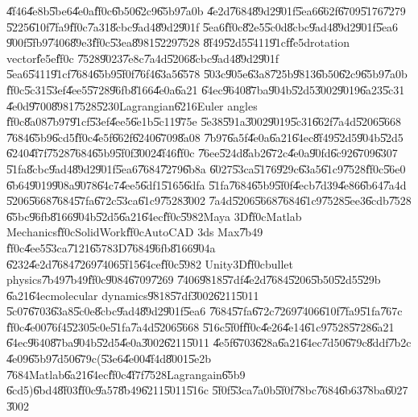 \documentclass[12pt,a4paper]{article}
\begin{document}
\U{4f46}\U{4e8b}\U{5be6}\U{4e0a}\U{ff0c}\U{6b50}\U{62c9}\U{65b9}\U{7a0b}%
\U{4e2d}\U{7684}\U{89d2}\U{901f}\U{5ea6}\U{662f}\U{6709}\U{5176}\U{7279}%
\U{5225}\U{610f}\U{7fa9}\U{ff0c}\U{7a31}\U{8cbc}\U{9ad4}\U{89d2}\U{901f}%
\U{5ea6}\U{ff0c}\U{82e5}\U{5c0d}\U{8cbc}\U{9ad4}\U{89d2}\U{901f}\U{5ea6}%
\U{900f}\U{5fb9}\U{7406}\U{89e3}\U{ff0c}\U{53ea}\U{8981}\U{5229}\U{7528}%
\U{8f49}\U{52d5}\U{5411}\U{91cf}\U{fe5d}rotation vector\U{fe5e}\U{ff0c}%
\U{7528}\U{9023}\U{7e8c}\U{7a4d}\U{5206}\U{8cbc}\U{9ad4}\U{89d2}\U{901f}%
\U{5ea6}\U{5411}\U{91cf}\U{7684}\U{65b9}\U{5f0f}\U{76f4}\U{63a5}\U{6578}%
\U{503c}\U{905e}\U{63a8}\U{725b}\U{9813}\U{6b50}\U{62c9}\U{65b9}\U{7a0b}%
\U{ff0c}\U{5c31}\U{53ef}\U{4ee5}\U{5728}\U{96fb}\U{8166}\U{4e0a}\U{6a21}%
\U{64ec}\U{9640}\U{87ba}\U{904b}\U{52d5}\U{3002}\U{9019}\U{6a23}\U{5c31}%
\U{4e0d}\U{9700}\U{8981}\U{7528}\U{5230}Lagrangian\U{6216}Euler angles%
\U{ff0c}\U{8a08}\U{7b97}\U{91cf}\U{53ef}\U{4ee5}\U{6e1b}\U{5c11}\U{975e}%
\U{5e38}\U{591a}\U{3002}\U{9019}\U{5c31}\U{662f}\U{7a4d}\U{5206}\U{5668}%
\U{7684}\U{65b9}\U{6cd5}\U{ff0c}\U{4e5f}\U{662f}\U{6240}\U{6709}\U{8a08}%
\U{7b97}\U{6a5f}\U{4e0a}\U{6a21}\U{64ec}\U{8f49}\U{52d5}\U{904b}\U{52d5}%
\U{6240}\U{4f7f}\U{7528}\U{7684}\U{65b9}\U{5f0f}\U{3002}\U{4f46}\U{ff0c}%
\U{76ee}\U{524d}\U{8ab2}\U{672c}\U{4e0a}\U{90fd}\U{6c92}\U{6709}\U{6307}%
\U{51fa}\U{8cbc}\U{9ad4}\U{89d2}\U{901f}\U{5ea6}\U{7684}\U{7279}\U{6b8a}%
\U{6027}\U{53ca}\U{5176}\U{929c}\U{63a5}\U{61c9}\U{7528}\U{ff0c}\U{56e0}%
\U{6b64}\U{9019}\U{908a}\U{9078}\U{64c7}\U{4ee5}\U{6df1}\U{5165}\U{6dfa}%
\U{51fa}\U{7684}\U{65b9}\U{5f0f}\U{4ecb}\U{7d39}\U{4e86}\U{6b64}\U{7a4d}%
\U{5206}\U{5668}\U{7684}\U{57fa}\U{672c}\U{53ca}\U{61c9}\U{7528}\U{3002}%
\U{7a4d}\U{5206}\U{5668}\U{7684}\U{61c9}\U{7528}\U{5ee3}\U{6cdb}\U{7528}%
\U{65bc}\U{96fb}\U{8166}\U{904b}\U{52d5}\U{6a21}\U{64ec}\U{ff0c}\U{5982}Maya
3D\U{ff0c}Matlab Mechanics\U{ff0c}SolidWork\U{ff0c}AutoCAD 3ds Max\U{7b49}%
\U{ff0c}\U{4ee5}\U{53ca}\U{7121}\U{6578}3D\U{7684}\U{96fb}\U{8166}\U{904a}%
\U{6232}\U{4e2d}\U{7684}\U{7269}\U{7406}\U{5f15}\U{64ce}\U{ff0c}\U{5982}%
Unity3D\U{ff0c}bullet physics\U{7b49}\U{7b49}\U{ff0c}\U{9084}\U{6709}\U{7269}%
\U{7406}\U{9818}\U{57df}\U{4e2d}\U{7684}\U{5206}\U{5b50}\U{52d5}\U{529b}%
\U{6a21}\U{64ec}molecular dynamics\U{9818}\U{57df}\U{3002}\U{6211}\U{5011}%
\U{5c07}\U{6703}\U{63a8}\U{5c0e}\U{8cbc}\U{9ad4}\U{89d2}\U{901f}\U{5ea6}%
\U{7684}\U{57fa}\U{672c}\U{7269}\U{7406}\U{610f}\U{7fa9}\U{51fa}\U{767c}%
\U{ff0c}\U{4e00}\U{76f4}\U{5230}\U{5c0e}\U{51fa}\U{7a4d}\U{5206}\U{5668}%
\U{516c}\U{5f0f}\U{ff0c}\U{4e26}\U{4e14}\U{61c9}\U{7528}\U{5728}\U{6a21}%
\U{64ec}\U{9640}\U{87ba}\U{904b}\U{52d5}\U{4e0a}\U{3002}\U{6211}\U{5011}%
\U{4e5f}\U{6703}\U{628a}\U{6a21}\U{64ec}\U{7d50}\U{679c}\U{8ddf}\U{7b2c}%
\U{4e09}\U{65b9}\U{7d50}\U{679c}(\U{53e6}\U{4e00}\U{4f4d}\U{8001}\U{5e2b}%
\U{7684}Matlab\U{6a21}\U{64ec}\U{ff0c}\U{4f7f}\U{7528}Lagrangain\U{65b9}%
\U{6cd5})\U{6bd4}\U{8f03}\U{ff0c}\U{9a57}\U{8b49}\U{6211}\U{5011}\U{516c}%
\U{5f0f}\U{53ca}\U{7a0b}\U{5f0f}\U{78bc}\U{7684}\U{6b63}\U{78ba}\U{6027}%
\U{3002}
\end{document}
